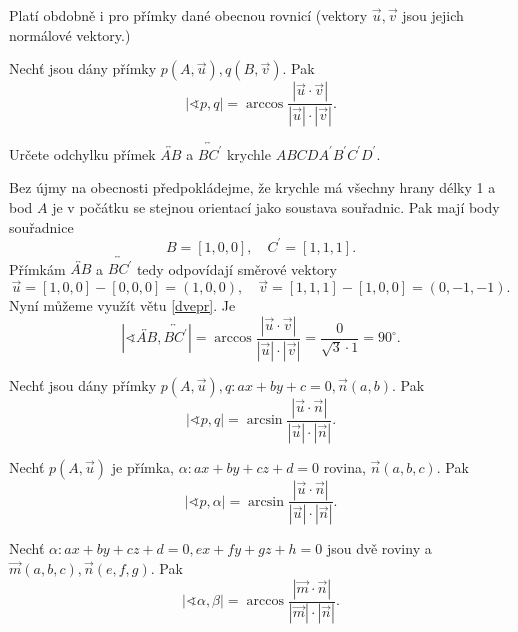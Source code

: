 \begin{pozn}
    Platí obdobně i pro přímky dané obecnou rovnicí (vektory $\vec u, \vec v$ jsou
    jejich normálové vektory.)
\end{pozn}

\begin{veta}\label{dvepr}
    Nechť jsou dány přímky $p(A,\vec u), q(B, \vec v).$ Pak
    $$|\sphericalangle p, q|=\arccos \frac{|\vec u \cdot \vec v|}{|\vec u|\cdot |\vec v|}.$$
\end{veta}

\begin{priklad}
Určete odchylku přímek $\overleftrightarrow{AB}$ a $\overleftrightarrow{BC^\prime}$
krychle $ABCDA^\prime B^\prime C^\prime D^\prime$.
\end{priklad}

\begin{reseni}
Bez újmy na obecnosti předpokládejme, že krychle má všechny hrany délky 1 a bod $A$ je v počátku se stejnou orientací
jako soustava souřadnic. Pak mají body souřadnice
$$
    B = [1,0,0],\quad C^\prime = [1,1,1].
$$
Přímkám $\overleftrightarrow{AB}$ a $\overleftrightarrow{BC^\prime}$ tedy odpovídají směrové vektory
$$
\vec u = [1,0,0] - [0,0,0] = (1,0,0), \quad \vec v=[1,1,1] - [1,0,0] = (0,-1,-1).
$$
Nyní můžeme využít větu \ref{dvepr}. Je
$$
    |\sphericalangle \overleftrightarrow{AB}, \overleftrightarrow{BC^\prime}| = \arccos \frac{|\vec u \cdot \vec v|}{|\vec u| \cdot |\vec v|} = \frac{0}{\sqrt{3}\cdot 1} = 90^\circ.
$$
\end{reseni}

\begin{veta}\label{odchdveprjinak}
Nechť jsou dány přímky $p(A,\vec u), q\colon ax+by+c=0, \vec n(a,b).$ Pak
$$|\sphericalangle p, q|=\arcsin \frac{|\vec u \cdot \vec n|}{|\vec u|\cdot |\vec n|}.$$
\end{veta}

\begin{veta}
    Nechť $p(A,\vec u)$ je přímka, $\alpha\colon ax+by+cz+d=0$ rovina, $\vec n(a,b,c)$. Pak
    $$|\sphericalangle p, \alpha|=\arcsin \frac{|\vec u \cdot \vec n|}{|\vec u|\cdot |\vec n|}.$$
\end{veta}

\begin{veta}\label{odchdvepr}
    Nechť $\alpha\colon ax+by+cz+d=0, ex+fy+gz+h=0$ jsou dvě roviny a~$\vec m(a,b,c), \vec n(e,f,g).$
    Pak
    $$|\sphericalangle \alpha, \beta|=\arccos \frac{|\vec m \cdot \vec n|}{|\vec m|\cdot |\vec n|}.$$
\end{veta}

